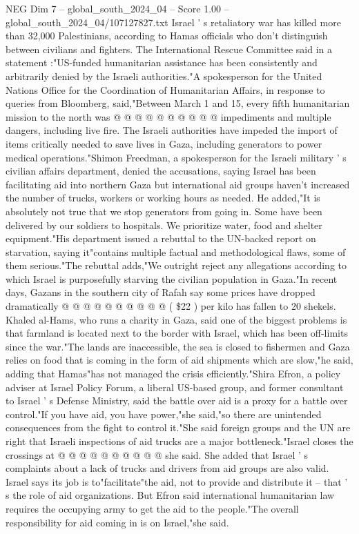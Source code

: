 \begin{textsample}{NEG Dim 7 – global\_south\_2024\_04 – Score 1.00 – global\_south\_2024\_04/107127827.txt}
Israel ' s retaliatory war has killed more than 32,000 Palestinians, according to Hamas officials who don't distinguish between civilians and fighters.
The International Rescue Committee said in a statement :"US-funded humanitarian assistance has been consistently and arbitrarily denied by the Israeli authorities."A spokesperson for the United Nations Office for the Coordination of Humanitarian Affairs, in response to queries from Bloomberg, said,"Between March 1 and 15, every fifth humanitarian mission to the north was @ @ @ @ @ @ @ @ @ @ impediments and multiple dangers, including live fire.
The Israeli authorities have impeded the import of items critically needed to save lives in Gaza, including generators to power medical operations."Shimon Freedman, a spokesperson for the Israeli military ' s civilian affairs department, denied the accusations, saying Israel has been facilitating aid into northern Gaza but international aid groups haven't increased the number of trucks, workers or working hours as needed.
He added,"It is absolutely not true that we stop generators from going in.
Some have been delivered by our soldiers to hospitals.
We prioritize water, food and shelter equipment."His department issued a rebuttal to the UN-backed report on starvation, saying it"contains multiple factual and methodological flaws, some of them serious."The rebuttal adds,"We outright reject any allegations according to which Israel is purposefully starving the civilian population in Gaza."In recent days, Gazans in the southern city of Rafah say some prices have dropped dramatically @ @ @ @ @ @ @ @ @ @ ( \$22 ) per kilo has fallen to 20 shekels.
Khaled al-Hams, who runs a charity in Gaza, said one of the biggest problems is that farmland is located next to the border with Israel, which has been off-limits since the war."The lands are inaccessible, the sea is closed to fishermen and Gaza relies on food that is coming in the form of aid shipments which are slow,"he said, adding that Hamas"has not managed the crisis efficiently."Shira Efron, a policy adviser at Israel Policy Forum, a liberal US-based group, and former consultant to Israel ' s Defense Ministry, said the battle over aid is a proxy for a battle over control."If you have aid, you have power,"she said,"so there are unintended consequences from the fight to control it."She said foreign groups and the UN are right that Israeli inspections of aid trucks are a major bottleneck."Israel closes the crossings at @ @ @ @ @ @ @ @ @ @ she said.
She added that Israel ' s complaints about a lack of trucks and drivers from aid groups are also valid.
Israel says its job is to"facilitate"the aid, not to provide and distribute it -- that ' s the role of aid organizations.
But Efron said international humanitarian law requires the occupying army to get the aid to the people."The overall responsibility for aid coming in is on Israel,"she said.

\end{textsample}
